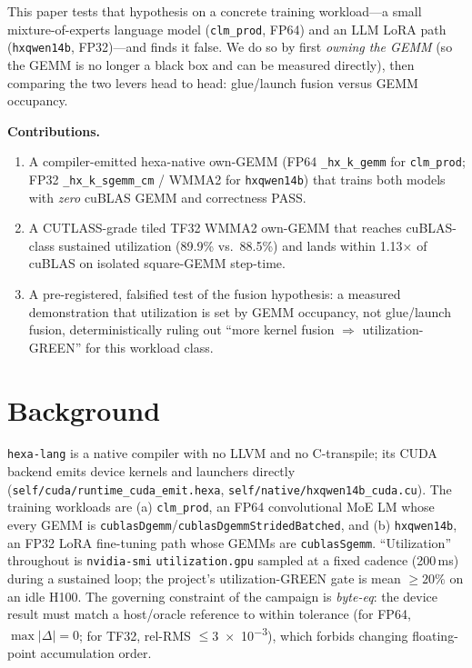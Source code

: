 \documentclass[11pt,a4paper]{article}
\begin{document}
This paper tests that hypothesis on a concrete training workload---a small
mixture-of-experts language model (\texttt{clm\_prod}, FP64) and an LLM LoRA path
(\texttt{hxqwen14b}, FP32)---and finds it false. We do so by first \emph{owning
the GEMM} (so the GEMM is no longer a black box and can be measured directly),
then comparing the two levers head to head: glue/launch fusion versus GEMM
occupancy.

\medskip
\noindent\textbf{Contributions.}
\begin{enumerate}\itemsep0.3em
\item A compiler-emitted hexa-native own-GEMM (FP64 \texttt{\_hx\_k\_gemm} for
\texttt{clm\_prod}; FP32 \texttt{\_hx\_k\_sgemm\_cm} / WMMA2 for \texttt{hxqwen14b})
that trains both models with \emph{zero} cuBLAS GEMM and correctness PASS.
\item A CUTLASS-grade tiled TF32 WMMA2 own-GEMM that reaches cuBLAS-class
sustained utilization (89.9\% vs.\ 88.5\%) and lands within 1.13$\times$ of cuBLAS
on isolated square-GEMM step-time.
\item A pre-registered, falsified test of the fusion hypothesis: a measured
demonstration that utilization is set by GEMM occupancy, not glue/launch fusion,
deterministically ruling out ``more kernel fusion $\Rightarrow$ utilization-GREEN''
for this workload class.
\end{enumerate}

\section{Background}
\label{sec:bg}

\texttt{hexa-lang} is a native compiler with no LLVM and no C-transpile; its CUDA
backend emits device kernels and launchers directly
(\texttt{self/cuda/runtime\_cuda\_emit.hexa}, \texttt{self/native/hxqwen14b\_cuda.cu}).
The training workloads are (a) \texttt{clm\_prod}, an FP64 convolutional MoE LM
whose every GEMM is \texttt{cublasDgemm}/\texttt{cublasDgemmStridedBatched}, and
(b) \texttt{hxqwen14b}, an FP32 LoRA fine-tuning path whose GEMMs are
\texttt{cublasSgemm}. ``Utilization'' throughout is \texttt{nvidia-smi}
\texttt{utilization.gpu} sampled at a fixed cadence (200\,ms) during a sustained
loop; the project's utilization-GREEN gate is mean $\geq 20\%$ on an idle H100.
The governing constraint of the campaign is \emph{byte-eq}: the device result
must match a host/oracle reference to within tolerance (for FP64,
$\max|\Delta|=0$; for TF32, rel-RMS $\leq$\SI{3e-3}{}), which forbids changing
floating-point accumulation order.
\end{document}
